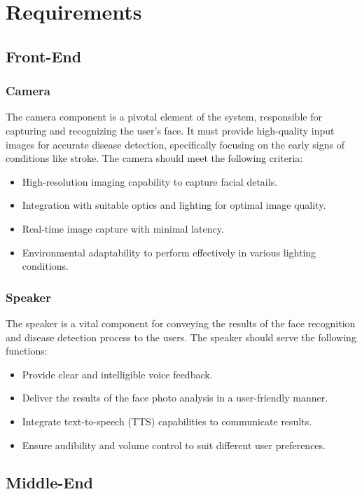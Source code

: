 \section{Requirements}
    \subsection{Front-End}
        \subsubsection{Camera}
            The camera component is a pivotal element of the system, responsible for capturing and recognizing the user's face. It must provide high-quality input images for accurate disease detection, specifically focusing on the early signs of conditions like stroke. The camera should meet the following criteria: 
            \begin{itemize}
                \item High-resolution imaging capability to capture facial details.
                \item Integration with suitable optics and lighting for optimal image quality.
                \item Real-time image capture with minimal latency.
                \item Environmental adaptability to perform effectively in various lighting conditions.
            \end{itemize}
        \subsubsection{Speaker}
            The speaker is a vital component for conveying the results of the face recognition and disease detection process to the users. The speaker should serve the following functions:
            \begin{itemize}
                \item Provide clear and intelligible voice feedback.
                \item Deliver the results of the face photo analysis in a user-friendly manner.
                \item Integrate text-to-speech (TTS) capabilities to communicate results.
                \item Ensure audibility and volume control to suit different user preferences.
            \end{itemize}
    \subsection{Middle-End}
